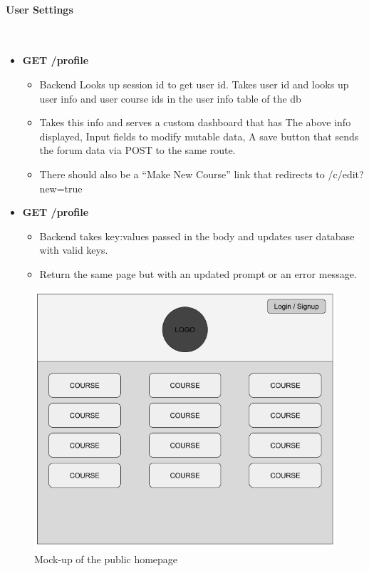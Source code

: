 \documentclass{article}
\begin{document}
\paragraph{User Settings}\\
\begin{itemize}
    \item \textbf{GET /profile}
        \begin{itemize}
        \item Backend Looks up session id to get user id. Takes user id and looks up user info and user course ids in the user info table of the db
        \item Takes this info and serves a custom dashboard that has The above info displayed, Input fields to modify mutable data, A save button that sends the forum data via POST to the same route.
        \item There should also be a “Make New Course” link that redirects to /c/edit?new=true
    \end{itemize}
\item \textbf{GET /profile}
    \begin{itemize}
        \item Backend takes key:values passed in the body and updates user database with valid keys.
        \item Return the same page but with an updated prompt or an error message.
    \end{itemize}
\end{itemize}
\begin{figure}[h]
    \caption{Mock-up of the public homepage}
    \includegraphics[width=\textwidth]{public_homepage}
\end{figure}
\end{document}
